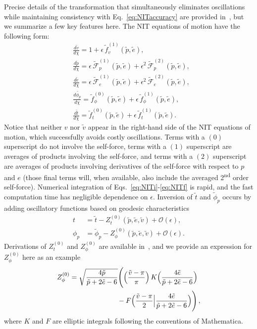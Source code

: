 \documentclass[aps,prd,twocolumn,showpacs,notitlepage,eqsecnum,
superscriptaddress,nofootinbib]{revtex4-1}
\begin{document}
Precise details of the transformation that simultaneously eliminates oscillations while maintaining consistency with Eq.~\eqref{eq:NITaccuracy} are provided in~\cite{VandWarb18}, but we summarize a few key features here. The NIT equations of motion have the following form:
\begin{align}
\label{eq:NITi}
& \frac{d\tilde{v}}{d\chi} = 1 + \epsilon \, \tilde{f}_v^{(1)}(\tilde{p},\tilde{e}) ,
\\
& \frac{d\tilde{p}}{d\chi} = \epsilon \, \tilde{\mathcal{F}}_p^{(1)}(\tilde{p},\tilde{e}) + \epsilon^2 \, \tilde{\mathcal{F}}_p^{(2)}(\tilde{p},\tilde{e}) ,
\\
& \frac{d\tilde{e}}{d\chi} = \epsilon \, \tilde{\mathcal{F}}_e^{(1)}(\tilde{p},\tilde{e}) + \epsilon^2 \, \tilde{\mathcal{F}}_e^{(2)}(\tilde{p},\tilde{e}) ,
\\
&\frac{d\tilde{\phi_p}}{d\chi} = \tilde{f}_\phi^{(0)}(\tilde{p},\tilde{e}) + \epsilon \, \tilde{f}_\phi^{(1)}(\tilde{p},\tilde{e}) ,
\\
&\frac{d\tilde{t}}{d\chi} = \tilde{f}_t^{(0)}(\tilde{p},\tilde{e}) + \epsilon \, \tilde{f}_t^{(1)}(\tilde{p},\tilde{e}) .
\label{eq:NITf}
\end{align}
Notice that neither $v$ nor $\tilde{v}$ appear in the right-hand side of the NIT equations of motion, which successfully avoids costly oscillations. Terms with a $(0)$ superscript do not involve the self-force, terms with a $(1)$ superscript are averages of products involving the self-force, and terms with a $(2)$ superscript are averages of products involving derivatives of the self-force with respect to $p$ and $e$ (those final terms will, when available, also include the averaged 2\textsuperscript{nd} order self-force). Numerical integration of Eqs.~\eqref{eq:NITi}-\eqref{eq:NITf} is rapid, and the fast computation time has negligible dependence on $\epsilon$. Inversion of $\tilde{t}$ and $\tilde{\phi}_p$ occurs by adding oscillatory functions based on geodesic characteristics
\begin{align}
    t &= \tilde{t} - Z^{(0)}_t(\tilde{p},\tilde{e},\tilde{v}) + \mathcal{O}(\epsilon) ,
    \\
    \phi_p &= \tilde{\phi}_p - Z^{(0)}_\phi(\tilde{p},\tilde{e},\tilde{v})+ \mathcal{O}(\epsilon) .
    \label{eq:phitilde}
\end{align}
Derivations of $Z^{(0)}_t$ and $Z^{(0)}_\phi$ are available in~\cite{VandWarb18}, and we provide an expression for $Z^{(0)}_\phi$ here as an example
\begin{align}
    & Z^{(0)}_\phi = \sqrt{\frac{4\tilde{p}}{\tilde{p}+2\tilde{e}-6}}\Bigg( \Big( \frac{\tilde{v}-\pi}{\pi}\Big) \, K\Big( \frac{4\tilde{e}}{\tilde{p}+2\tilde{e}-6} \Big) \notag
    \\
    &\qquad\qquad\qquad\qquad\;\;\, - F\Big(\frac{\tilde{v}-\pi}{2} \Big| \frac{4\tilde{e}}{\tilde{p}+2\tilde{e}-6} \Big) \Bigg)\, ,
\end{align}
where $K$ and $F$ are elliptic integrals following the conventions of Mathematica.
\end{document}
